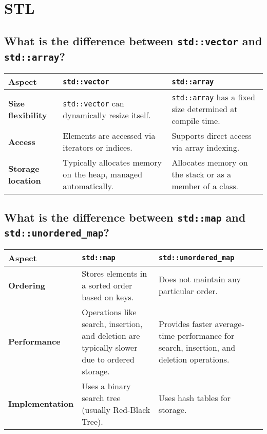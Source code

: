 \section{STL}

\subsection{What is the difference between \texttt{std::vector} and \texttt{std::array}?}
\begin{tabularx}{\textwidth}{|p{3.5cm}|X|X|}
    \hline \rowcolor{tableheader}
    \textbf{Aspect}                  & \textbf{\texttt{std::vector}}                                  & \textbf{\texttt{std::array}} \\
    \hline \textbf{Size flexibility} & \texttt{std::vector} can dynamically resize itself.            & \texttt{std::array} has a fixed size determined at compile time. \\
    \hline \textbf{Access}           & Elements are accessed via iterators or indices.                & Supports direct access via array indexing. \\
    \hline \textbf{Storage location} & Typically allocates memory on the heap, managed automatically. & Allocates memory on the stack or as a member of a class. \\
    \hline
\end{tabularx}

\subsection{What is the difference between \texttt{std::map} and \texttt{std::unordered\_map}?}
\begin{tabularx}{\textwidth}{|p{3.5cm}|X|X|}
    \hline \rowcolor{tableheader}
    \textbf{Aspect}                & \textbf{\texttt{std::map}}                          & \textbf{\texttt{std::unordered\_map}} \\
    \hline \textbf{Ordering}       & Stores elements in a sorted order based on keys.    & Does not maintain any particular order. \\
    \hline \textbf{Performance}    & Operations like search, insertion, and deletion are typically slower due to ordered storage. & Provides faster average-time performance for search, insertion, and deletion operations. \\
    \hline \textbf{Implementation} & Uses a binary search tree (usually Red-Black Tree). & Uses hash tables for storage. \\
    \hline
\end{tabularx}

